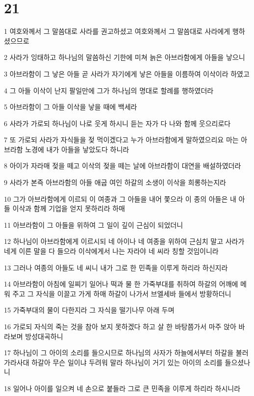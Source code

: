 \chapter{21}

\par 1 여호와께서 그 말씀대로 사라를 권고하셨고 여호와께서 그 말씀대로 사라에게 행하셨으므로
\par 2 사라가 잉태하고 하나님의 말씀하신 기한에 미쳐 늙은 아브라함에게 아들을 낳으니
\par 3 아브라함이 그 낳은 아들 곧 사라가 자기에게 낳은 아들을 이름하여 이삭이라 하였고
\par 4 그 아들 이삭이 난지 팔일만에 그가 하나님의 명대로 할례를 행하였더라
\par 5 아브라함이 그 아들 이삭을 낳을 때에 백세라
\par 6 사라가 가로되 하나님이 나로 웃게 하시니 듣는 자가 다 나와 함께 웃으리로다
\par 7 또 가로되 사라가 자식들을 젖 먹이겠다고 누가 아브라함에게 말하였으리요 마는 아브라함 노경에 내가 아들을 낳았도다 하니라
\par 8 아이가 자라매 젖을 떼고 이삭의 젖을 떼는 날에 아브라함이 대연을 배설하였더라
\par 9 사라가 본즉 아브라함의 아들 애굽 여인 하갈의 소생이 이삭을 희롱하는지라
\par 10 그가 아브라함에게 이르되 이 여종과 그 아들을 내어 쫓으라 이 종의 아들은 내 아들 이삭과 함께 기업을 얻지 못하리라 하매
\par 11 아브라함이 그 아들을 위하여 그 일이 깊이 근심이 되었더니
\par 12 하나님이 아브라함에게 이르시되 네 아이나 네 여종을 위하여 근심치 말고 사라가 네게 이른 말을 다 들으라 이삭에게서 나는 자라야 네 씨라 칭할 것임이니라
\par 13 그러나 여종의 아들도 네 씨니 내가 그로 한 민족을 이루게 하리라 하신지라
\par 14 아브라함이 아침에 일찌기 일어나 떡과 물 한 가죽부대를 취하여 하갈의 어깨에 메워 주고 그 자식을 이끌고 가게 하매 하갈이 나가서 브엘세바 들에서 방황하더니
\par 15 가죽부대의 물이 다한지라 그 자식을 떨기나무 아래 두며
\par 16 가로되 자식의 죽는 것을 참아 보지 못하겠다 하고 살 한 바탕쯤가서 마주 앉아 바라보며 방성대곡하니
\par 17 하나님이 그 아이의 소리를 들으시므로 하나님의 사자가 하늘에서부터 하갈을 불러 가라사대 하갈아 무슨 일이냐 두려워 말라 하나님이 거기 있는 아이의 소리를 들으셨나니
\par 18 일어나 아이를 일으켜 네 손으로 붙들라 그로 큰 민족을 이루게 하리라 하시니라
